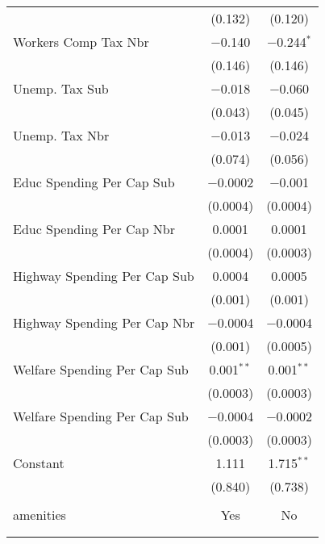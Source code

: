 \begin{table}[!htbp]
\begin{tabular}{@{\extracolsep{5pt}}lcc}
  & (0.132) & (0.120) \\ 
  Workers Comp Tax Nbr & $-$0.140 & $-$0.244$^{*}$ \\ 
  & (0.146) & (0.146) \\ 
  Unemp. Tax Sub & $-$0.018 & $-$0.060 \\ 
  & (0.043) & (0.045) \\ 
  Unemp. Tax Nbr & $-$0.013 & $-$0.024 \\ 
  & (0.074) & (0.056) \\ 
  Educ Spending Per Cap Sub & $-$0.0002 & $-$0.001 \\ 
  & (0.0004) & (0.0004) \\ 
  Educ Spending Per Cap Nbr & 0.0001 & 0.0001 \\ 
  & (0.0004) & (0.0003) \\ 
  Highway Spending Per Cap Sub & 0.0004 & 0.0005 \\ 
  & (0.001) & (0.001) \\ 
  Highway Spending Per Cap Nbr & $-$0.0004 & $-$0.0004 \\ 
  & (0.001) & (0.0005) \\ 
  Welfare Spending Per Cap Sub & 0.001$^{**}$ & 0.001$^{**}$ \\ 
  & (0.0003) & (0.0003) \\ 
  Welfare Spending Per Cap Sub & $-$0.0004 & $-$0.0002 \\ 
  & (0.0003) & (0.0003) \\ 
  Constant & 1.111 & 1.715$^{**}$ \\ 
  & (0.840) & (0.738) \\ 
 \hline \\[-1.8ex] 
amenities & Yes & No \\ 
\hline \\[-1.8ex] 
\hline 
\hline \\[-1.8ex] 
\end{tabular} 
\end{table} 
